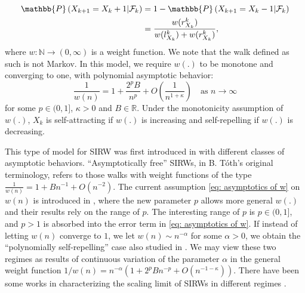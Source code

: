 \documentclass[EJP]{ejpecp} %
\begin{document}
\begin{align}
	\mathbb{P}\left( X_{k+1} =  X_k+1 \middle| \mathcal{F}_k   \right) 
	&=1- \mathbb{P}\left( X_{k+1} =  X_k-1 \middle|  \mathcal{F}_k  \right)  
	\notag
	\\
	&=  \frac{  w(r_{X_k}^k)}{ w(l_{X_k}^k)  + w(r_{X_k}^k)   }
	, \label{eq: dynamic}
\end{align}
where $
w: \mathbb{N} \to  (0, \infty )
$ 
is a weight function.
We note that the walk defined as such is not Markov.
In this model, we require $w(.)$ to be monotone and converging to one, with polynomial asymptotic behavior:
\begin{equation}\label{eq: asymptotics of w}
	\frac{1}{w(n)} = 1 + \frac{2^p B}{n^p} + O\left(\frac{1}{n^{1+\mathcal{\kappa}}}\right) \quad \mbox{as $n\to \infty$} 	
\end{equation} 
for some $p \in (0,1]$, $\kappa>0$ and $B\in \mathbb{R}$. Under the monotonicity assumption of $w(.)$, $X_k$ is self-attracting if $w(.)$ is increasing and self-repelling if $w(. )$ is decreasing.


This type of model for SIRW was first introduced in \cite{T96} with different classes of asymptotic behaviors. ``Asymptotically free'' SIRWs, in B. T\'oth's original terminology, refers to those walks with weight functions of the type $\frac{1}{w(n)} = 1 + B n^{-1} + O(n^{-2})$. 
The current assumption \eqref{eq: asymptotics of w} on $w(n)$ is introduced in \cite{KMP23}, where the new parameter $p$ allows more general $w(.)$ and their results rely on the range of $p$. The interesting range of $p$ is $p \in (0,1]$, and $p > 1$ is absorbed into the error term in \eqref{eq: asymptotics of w}.
If instead of letting $w(n)$ converge to $1$, we let $w(n) \sim n^{-\alpha}$ for some $\alpha >0$, we obtain the ``polynomially self-repelling'' case also studied in \cite{T96}. 
We may view these two regimes as results of continuous variation of the parameter $\alpha$ in the general weight function $1/w(n) = n^{- \alpha}(1 + 2^p B n^{-p} + O(n^{-1-\kappa}))$.
There have been some works in characterizing the scaling limit of SIRWs in different regimes \cite{T96, KMP23}.
\end{document}
